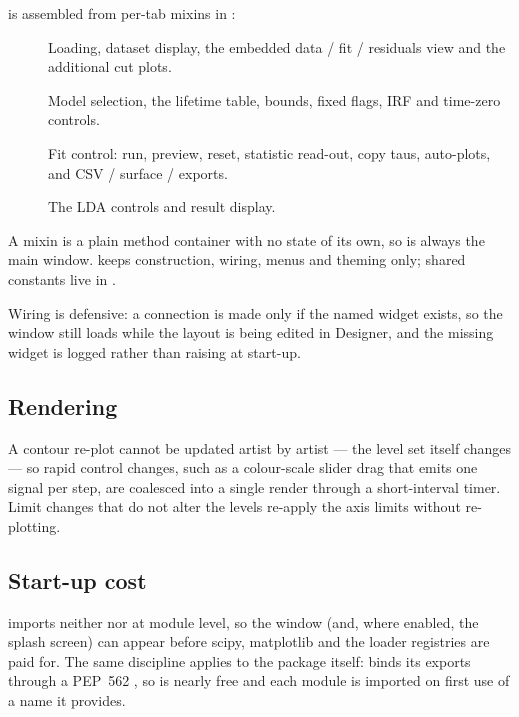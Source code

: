  is assembled from per-tab mixins in :

\begin{description}
  \item[] Loading, dataset display, the embedded
    data / fit / residuals view and the additional cut plots.
  \item[] Model selection, the lifetime table, bounds,
    fixed flags, IRF and time-zero controls.
  \item[] Fit control: run, preview, reset, statistic
    read-out, copy taus, auto-plots, and CSV / surface /  exports.
  \item[] The LDA controls and result display.
\end{description}

A mixin is a plain method container with no state of its own, so  is
always the main window.  keeps construction, wiring,
menus and theming only; shared constants live in .

Wiring is defensive: a connection is made only if the named widget exists, so
the window still loads while the layout is being edited in Designer, and the
missing widget is logged rather than raising at start-up.

\subsection{Rendering}

A contour re-plot cannot be updated artist by artist --- the level set itself
changes --- so rapid control changes, such as a colour-scale slider drag that
emits one signal per step, are coalesced into a single render through a
short-interval timer. Limit changes that do not alter the levels re-apply the
axis limits without re-plotting.

\subsection{Start-up cost}

 imports neither  nor  at module
level, so the window (and, where enabled, the splash screen) can appear before
scipy, matplotlib and the loader registries are paid for. The same discipline
applies to the package itself:  binds its exports
through a PEP~562 , so  is nearly
free and each module is imported on first use of a name it provides.
